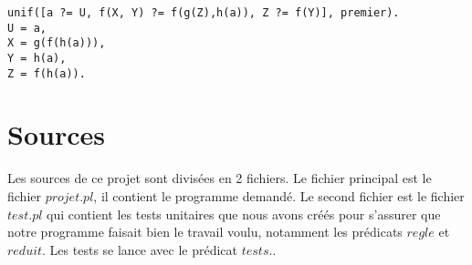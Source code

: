 \documentclass[10pt,a4paper]{report}
\begin{document}
\begin{lstlisting}[caption ={Exemple d'exécution }]
unif([a ?= U, f(X, Y) ?= f(g(Z),h(a)), Z ?= f(Y)], premier).
U = a,
X = g(f(h(a))),
Y = h(a),
Z = f(h(a)).
\end{lstlisting}

\chapter{Sources}
Les sources de ce projet sont divisées en 2 fichiers. Le fichier principal est le fichier $projet.pl$, il contient le programme demandé. Le second fichier est le fichier $test.pl$ qui contient les tests unitaires que nous avons créés pour s'assurer que notre programme faisait bien le travail voulu, notamment les prédicats $regle$ et $reduit$. Les tests se lance avec le prédicat $tests.$.
\end{document}
